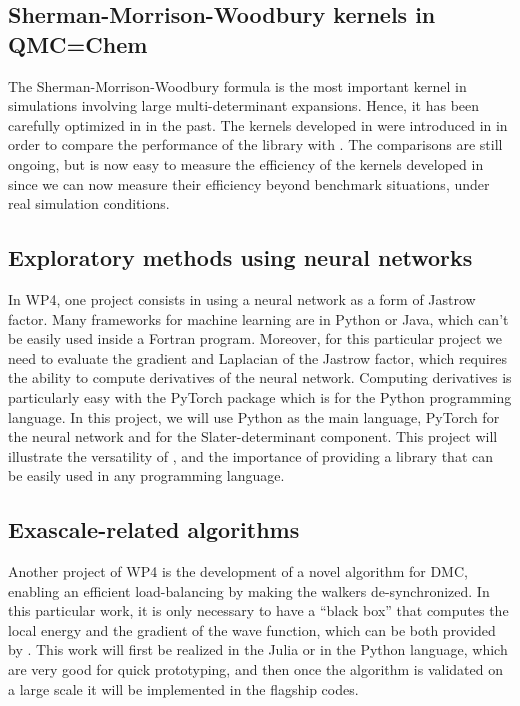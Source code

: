 \subsection{Sherman-Morrison-Woodbury kernels in QMC=Chem}

The Sherman-Morrison-Woodbury formula is the most important kernel in
simulations involving large multi-determinant expansions. Hence, it has
been carefully optimized in \qmcchem{} in the past. The kernels
developed in \QMCkl{} were introduced in \qmcchem{} in order
to compare the performance of the library with \qmcchem{}. The
comparisons are still ongoing, but is now easy to measure the
efficiency of the kernels developed in \QMCkl{} since we can now
measure their efficiency beyond benchmark situations, under real
simulation conditions.

\subsection{Exploratory methods using neural networks}

In \ac{WP}4, one project consists in using a neural network as a
form of Jastrow factor. Many frameworks for machine learning are in
Python or Java, which can't be easily used inside a Fortran program.
Moreover, for this particular project we need to evaluate the gradient
and Laplacian of the Jastrow factor, which requires the ability to
compute derivatives of the neural network. Computing derivatives is
particularly easy with the PyTorch package which is for the Python
programming language. In this project, we will use Python as the main
language, PyTorch for the neural network and \QMCkl for the
Slater-determinant component. This project will illustrate the
versatility of \QMCkl, and the importance of providing a library that
can be easily used in any programming language.


\subsection{Exascale-related algorithms}

Another project of \ac{WP}4 is the development of a novel algorithm
for \ac{DMC}, enabling an efficient load-balancing by
making the walkers de-synchronized. In this particular work, it is only
necessary to have a ``black box'' that computes the local energy and
the gradient of the wave function, which can be both provided by \QMCkl{}.
This work will first be realized in the Julia or in the Python
language, which are very good for quick prototyping, and then once the
algorithm is validated on a large scale it will be implemented in the
flagship codes.


